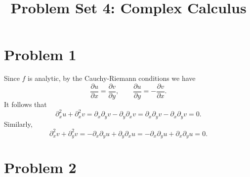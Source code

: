 \documentclass[11pt, letterpaper]{article}
\title{Problem Set 4: Complex Calculus}
\begin{document}
\makeproblem
\section*{Problem 1}
Since $f$ is analytic, by the Cauchy-Riemann conditions we have
\[
	\frac{\partial u}{\partial x} =\frac{\partial v}{\partial y} ,\qquad \frac{\partial u}{\partial y} =-\frac{\partial v}{\partial x} 
.\]
It follows that
\[
	\partial_x^2 u + \partial_x^2 v = \partial_x \partial_y v-\partial_y \partial_x v=\partial_x \partial_yv - \partial_x \partial_yv=0
.\]
Similarly,
\[
	\partial_x^2v+\partial_y^2v=-\partial_x \partial _y u+\partial _y \partial _x u=-\partial_x \partial _y u + \partial _x \partial _y u = 0
.\]
\section*{Problem 2}
\end{document}
